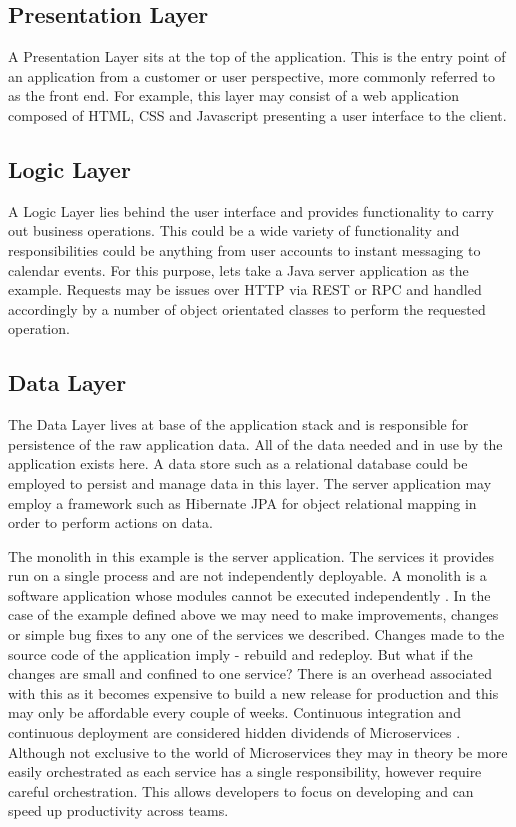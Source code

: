 \subsection{Presentation Layer}
A Presentation Layer sits at the top of the application. This is the entry point of an application from a customer or user perspective, more commonly referred to as the front end. For example, this layer may consist of a web application composed of HTML, CSS and Javascript presenting a user interface to the client. 

\subsection{Logic Layer}
A Logic Layer lies behind the user interface and provides functionality to carry out business operations. This could be a wide variety of functionality and responsibilities could be anything from user accounts to instant messaging to calendar events. For this purpose, lets take a Java server application as the example. Requests may be issues over HTTP via REST\cite{Fielding:2000:ASD:932295} or RPC and handled accordingly by a number of object orientated classes to perform the requested operation.

\subsection{Data Layer}
The Data Layer lives at base of the application stack and is responsible for persistence of the raw application data. All of the data needed and in use by the application exists here. A data store such as a relational database could be employed to persist and manage data in this layer. The server application may employ a framework such as Hibernate\cite{JPAHibernate} JPA for object relational mapping in order to perform actions on data. 

The monolith in this example is the server application. The services it provides run on a single process and are not independently deployable. A monolith is a software application whose modules cannot be executed independently \cite{MicroservicesYesterdayTodayTomorrow}. In the case of the example defined above we may need to make improvements, changes or simple bug fixes to any one of the services we described. Changes made to the source code of the application imply - rebuild and redeploy. But what if the changes are small and confined to one service? There is an overhead associated with this as it becomes expensive to build a new release for production and this may only be affordable every couple of weeks. Continuous integration and continuous deployment are considered hidden dividends of Microservices \cite{hiddendividends}. Although not exclusive to the world of Microservices they may in theory be more easily orchestrated as each service has a single responsibility, however require careful orchestration. This allows developers to focus on developing and can speed up productivity across teams. 

